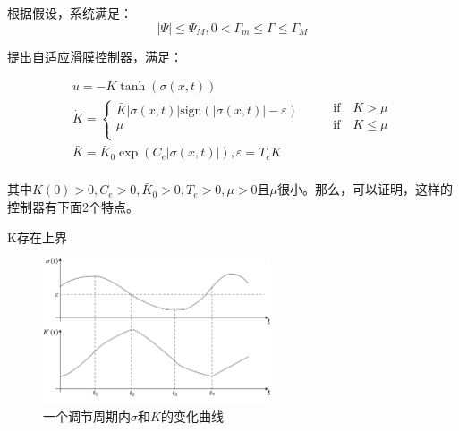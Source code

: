 根据假设，系统满足：
\begin{equation}
    \left| \varPsi \right|\le \varPsi _M, 0<\varGamma _m\le \varGamma \le \varGamma _M
    \label{eqn:sys_constrain}
\end{equation}

提出自适应滑膜控制器，满足：

\begin{equation}
    \begin{array}{c}
        u=-K\tanh \left( \sigma \left( x,t \right) \right)\\
        \dot{K}=\begin{cases}
        \bar{K}\left| \sigma \left( x,t \right) \right|\mathrm{sign}\left( \left| \sigma \left( x,t \right) \right|-\varepsilon \right)\\
        \mu\\
    \end{cases}\qquad \begin{array}{c}
        \mathrm{if}\quad K>\mu\\
        \mathrm{if}\quad K\le \mu\\
    \end{array}\\
        \bar{K}=\bar{K}_0\exp \left( C_e\left| \sigma \left( x,t \right) \right| \right) , \varepsilon =T_eK\\
    \end{array}
    \label{eqn:controller}
\end{equation}

其中$K\left( 0 \right) >0,C_e>0,\bar{K}_0>0,T_e >0,\mu >0$且$\mu$很小。那么，可以证明，这样的控制器有下面2个特点。

\begin{lemma}
    K存在上界
    \label{lemma1}
\end{lemma}

\begin{figure}[H]
    \centering
    \includegraphics[width=0.6\textwidth]{imgs/math_proof_1.png}
    \caption{一个调节周期内$\sigma$和$K$的变化曲线}
    \label{fig:math_proof_1}
\end{figure}

